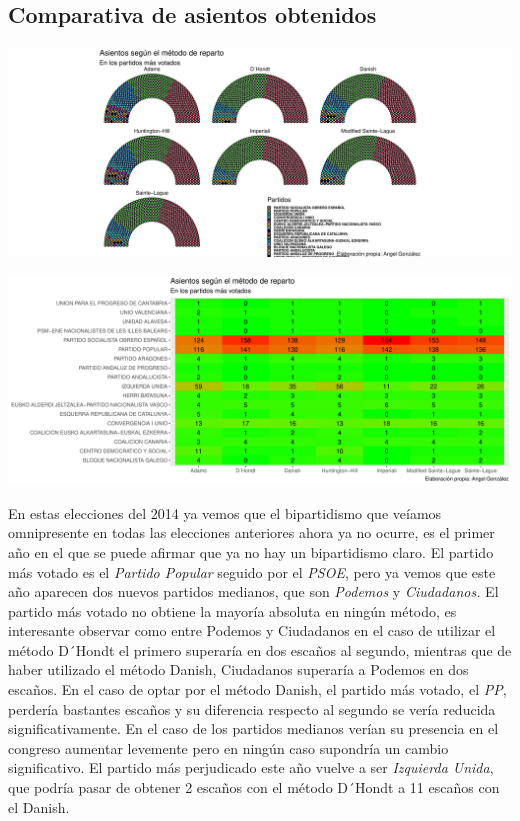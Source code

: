 \documentclass[12pt,a4paper,]{book}
\numberwithin{dummy}{section}
\theoremstyle{ocrenumbox}
\theoremstyle{blacknumex}
\theoremstyle{blacknumbox}
\theoremstyle{ocrenum}
\theoremstyle{ocrenum}
\begin{document}
\hypertarget{comparativa-de-asientos-obtenidos-11}{%
\subsection{Comparativa de asientos
obtenidos}\label{comparativa-de-asientos-obtenidos-11}}

\begin{center}\includegraphics[width=1\linewidth]{figurasR/unnamed-chunk-106-1} \end{center}

\begin{center}\includegraphics[width=1\linewidth]{figurasR/unnamed-chunk-106-2} \end{center}

En estas elecciones del 2014 ya vemos que el bipartidismo que veíamos
omnipresente en todas las elecciones anteriores ahora ya no ocurre, es
el primer año en el que se puede afirmar que ya no hay un bipartidismo
claro. El partido más votado es el \emph{Partido Popular} seguido por el
\emph{PSOE}, pero ya vemos que este año aparecen dos nuevos partidos
medianos, que son \emph{Podemos} y \emph{Ciudadanos.} El partido más
votado no obtiene la mayoría absoluta en ningún método, es interesante
observar como entre Podemos y Ciudadanos en el caso de utilizar el
método D´Hondt el primero superaría en dos escaños al segundo, mientras
que de haber utilizado el método Danish, Ciudadanos superaría a Podemos
en dos escaños. En el caso de optar por el método Danish, el partido más
votado, el \emph{PP}, perdería bastantes escaños y su diferencia
respecto al segundo se vería reducida significativamente. En el caso de
los partidos medianos verían su presencia en el congreso aumentar
levemente pero en ningún caso supondría un cambio significativo. El
partido más perjudicado este año vuelve a ser \emph{Izquierda Unida},
que podría pasar de obtener 2 escaños con el método D´Hondt a 11 escaños
con el Danish.
\end{document}
